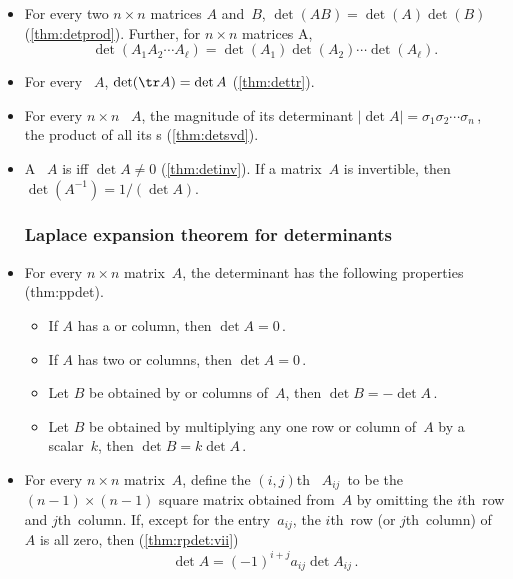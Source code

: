 \begin{itemize}
\item For every two \(n\times n\) matrices \(A\) and~\(B\), \(\det(AB)=\det(A)\det(B)\) (\autoref{thm:detprod}).
Further, for \(n\times n\) matrices \hlist A\ell, \begin{equation*}
\det(A_1A_2\cdots A_\ell)=\det(A_1)\det(A_2)\cdots\det(A_\ell).
\end{equation*}


\item For every ~\(A\), \(\det(\tr A)=\det A\) (\autoref{thm:dettr}).

\item For every \(n\times n\) ~\(A\), the magnitude of its determinant \(|\det A|=\sigma_1\sigma_2\cdots\sigma_n\)\,, the product of all its s (\autoref{thm:detsvd}).

\item A ~\(A\) is  iff \(\det A\neq 0\) (\autoref{thm:detinv}).
If a matrix~\(A\) is invertible, then \(\det(A^{-1})=1/(\det A)\).







\subsubsection*{Laplace expansion theorem for determinants}

\item For every \(n\times n\) matrix~\(A\), the determinant has the following properties (thm:ppdet).
\begin{itemize}
\item
If \(A\) has a  or column, then \(\det A=0\)\,.
\item
If \(A\) has two  or columns, then  \(\det A=0\)\,.
\item
Let \(B\) be obtained by  or columns of~\(A\), then \(\det B=-\det A\)\,.
\item
Let \(B\) be obtained by multiplying any one row or column of~\(A\) by a scalar~\(k\), then \(\det B=k\det A\)\,.
\end{itemize}

\item For every \(n\times n\) matrix~\(A\),
define the \((i,j)\)th~ \(A_{ij}\)~to be the \((n-1)\times(n-1)\) square matrix obtained from~\(A\) by omitting the \(i\)th~row and \(j\)th~column.  
If, except for the entry~\(a_{ij}\), the \(i\)th~row (or \(j\)th~column) of~\(A\) is all zero, then (\autoref{thm:rpdet:vii})
\begin{equation*}
\det A=(-1)^{i+j}a_{ij}\det A_{ij}\,.
\end{equation*}


\end{itemize}
